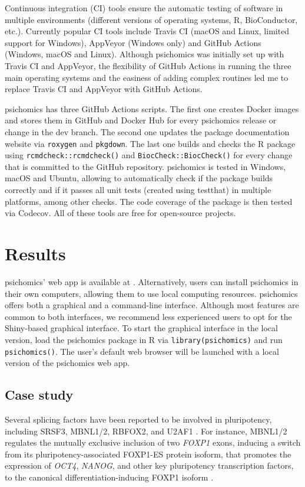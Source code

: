 Continuous integration (CI) tools ensure the automatic testing of software in multiple environments (different versions of operating systems, R, BioConductor, etc.). Currently popular CI tools include Travis CI (macOS and Linux, limited support for Windows), AppVeyor (Windows only) and GitHub Actions (Windows, macOS and Linux). Although psichomics was initially set up with Travis CI and AppVeyor, the flexibility of GitHub Actions in running the three main operating systems and the easiness of adding complex routines led me to replace Travis CI and AppVeyor with GitHub Actions.

psichomics has three GitHub Actions scripts. The first one creates Docker images and stores them in GitHub and Docker Hub for every psichomics release or change in the dev branch. The second one updates the package documentation website via \texttt{roxygen} and \texttt{pkgdown}. The last one builds and checks the R package using \texttt{rcmdcheck::rcmdcheck()} and \texttt{BiocCheck::BiocCheck()} for every change that is committed to the GitHub repository. psichomics is tested in Windows, macOS and Ubuntu, allowing to automatically check if the package builds correctly and if it passes all unit tests (created using testthat) in multiple platforms, among other checks. The code coverage of the package is then tested via Codecov. All of these tools are free for open-source projects.

\section{Results}

psichomics' web app is available at . Alternatively, users can install psichomics in their own computers, allowing them to use local computing resources. psichomics offers both a graphical and a command-line interface. Although most features are common to both interfaces, we recommend less experienced users to opt for the Shiny-based graphical interface. To start the graphical interface in the local version, load the psichomics package in R via \texttt{library(psichomics)} and run \texttt{psichomics()}. The user's default web browser will be launched with a local version of the psichomics web app.

\subsection{Case study}

Several splicing factors have been reported to be involved in pluripotency, including SRSF3, MBNL1/2, RBFOX2, and U2AF1 \cite{zavolan:2018vi,han:2013ww,venables:2013tz,chen:2015wm}. For instance, MBNL1/2 regulates the mutually exclusive inclusion of two \emph{FOXP1} exons, inducing a switch from its pluripotency-associated FOXP1-ES protein isoform, that promotes the expression of \emph{OCT4}, \emph{NANOG}, and other key pluripotency transcription factors, to the canonical differentiation-inducing FOXP1 isoform \cite{gabut:2011wk}.

